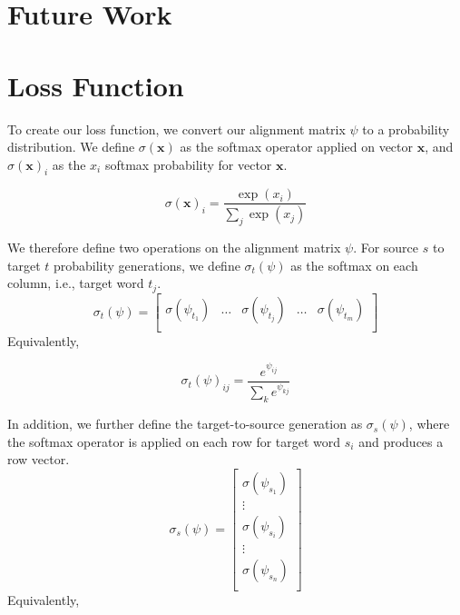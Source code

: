 \documentclass[twoside,twocolumn]{article}
\renewcommand{\vec}[1]{\mathbf{#1}}
\newlength\mystoreparindent
\newenvironment{myparindent}[1]{%
  \setlength{\mystoreparindent}{\the\parindent}
  \setlength{\parindent}{#1}
  }{%
  \setlength{\parindent}{\mystoreparindent}
}
\begin{document}
\section{Future Work}









\clearpage
\appendix
\onecolumn
\begin{myparindent}{0pt}
\section{Loss Function}
\label{appendix:loss-function}
To create our loss function, we convert our alignment matrix $\psi$
to a probability distribution. We define $\sigma(\vec{x})$ as
the softmax operator applied on vector $\vec{x}$, and $\sigma(\vec{x})_i$ as
the $x_i$ softmax probability for vector $\vec{x}$.

\begin{equation}
\sigma(\vec{x})_i = \frac{\exp(x_i)}{\sum_j\exp(x_j)}
\end{equation}

We therefore define two operations on the alignment matrix $\psi$. For source
$s$ to target $t$ probability generations, we define $\sigma_t(\psi)$ as the
softmax on each column, i.e., target word $t_j$.
\begin{equation}
  \sigma_t(\psi) = \left[
    \begin{matrix}
      \sigma(\psi_{t_1}) &
      \hdots &
      \sigma(\psi_{t_j}) &
      \hdots &
      \sigma(\psi_{t_m})  \\
    \end{matrix}
\right]
\end{equation}
Equivalently,

\begin{equation}
  \sigma_t(\psi)_{ij} = \frac{e^{\psi_{ij}}}{\sum_{k} e^{\psi_{kj}}}
\end{equation}

In addition, we further define the target-to-source generation as
$\sigma_s(\psi)$, where the softmax operator is applied on each row for target
word $s_i$ and produces a row vector.
\begin{equation}
  \sigma_s(\psi) = \left[
    \begin{matrix}
      \sigma(\psi_{s_1})  \\
      \vdots \\
      \sigma(\psi_{s_i})  \\
      \vdots \\
      \sigma(\psi_{s_n})  \\
    \end{matrix}
\right]
\end{equation}
Equivalently,


\end{myparindent}
\end{document}
